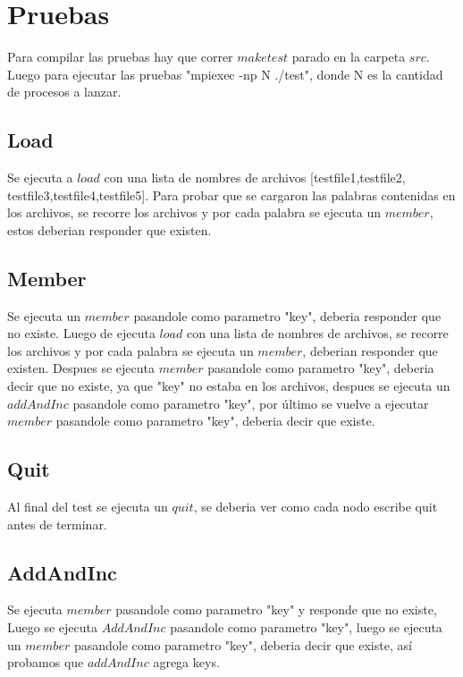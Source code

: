 \section{Pruebas}

Para compilar las pruebas hay que correr $make test$ parado en la carpeta $src$.
Luego para ejecutar las pruebas "mpiexec -np N ./test", donde N es la cantidad
de procesos a lanzar.

\subsection{Load}

Se ejecuta a $load$ con una lista de nombres de archivos [testfile1,testfile2,
testfile3,testfile4,testfile5]. Para probar que se cargaron las palabras
contenidas en los archivos, se recorre los archivos y por cada palabra se
ejecuta un $member$, estos deberian responder que existen.

\subsection{Member}

Se ejecuta un $member$ pasandole como parametro "key", deberia responder que
no existe. Luego de ejecuta $load$ con una lista de nombres de archivos, se
recorre los archivos y por cada palabra se ejecuta un $member$, deberian
responder que existen. Despues se ejecuta $member$ pasandole como parametro
"key", deberia decir que no existe, ya que "key" no estaba en los archivos,
despues se ejecuta un $addAndInc$ pasandole como parametro "key", por último
se vuelve a ejecutar $member$ pasandole como parametro "key", deberia decir
que existe.

\subsection{Quit}

Al final del test se ejecuta un $quit$, se deberia ver como cada nodo escribe
quit antes de terminar.

\subsection{AddAndInc}
Se ejecuta $member$ pasandole como parametro "key" y responde que
no existe, Luego se ejecuta $AddAndInc$ pasandole como parametro "key", luego
se ejecuta un $member$ pasandole como parametro "key", deberia decir que
existe, así probamos que $addAndInc$ agrega keys.

